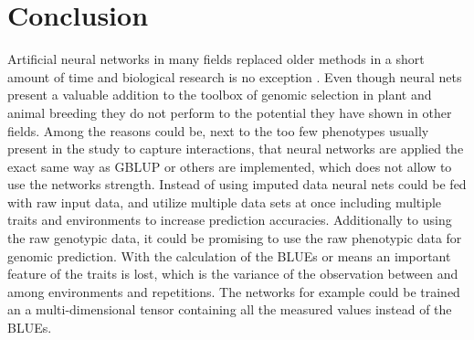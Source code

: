 \section{Conclusion}
Artificial neural networks in many fields replaced older methods in a short amount of time
and biological research is no exception \cite{angermueller2016}. Even though neural nets
present a valuable addition to the toolbox of genomic selection in plant and animal
breeding they do not perform to the potential they have shown in other fields.  Among the
reasons could be, next to the too few phenotypes usually present in the study to capture
interactions, that neural networks are applied the exact same way as GBLUP or others are
implemented, which does not allow to use the networks strength. Instead of using imputed
data neural nets could be fed with raw input data, and utilize multiple data sets at once
including multiple traits and environments to increase prediction accuracies. Additionally
to using the raw genotypic data, it could be promising to use the raw phenotypic data for
genomic prediction. With the calculation of the BLUEs or means an important feature of the
traits is lost, which is the variance of the observation between and among environments
and repetitions. The networks for example could be trained an a multi-dimensional tensor
containing all the measured values instead of the BLUEs. \\



